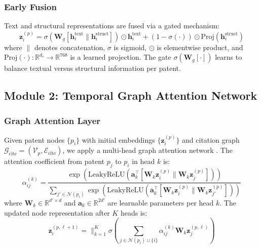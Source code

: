 \documentclass[journal]{IEEEtran}
\begin{document}
\subsubsection{Early Fusion}

Text and structural representations are fused via a gated mechanism:
\begin{equation}
    \mathbf{z}_i^{(p)} = \sigma(\mathbf{W}_g [\mathbf{h}_i^{\text{text}} \| \mathbf{h}_i^{\text{struct}}]) \odot \mathbf{h}_i^{\text{text}} + (1 - \sigma(\cdot)) \odot \text{Proj}(\mathbf{h}_i^{\text{struct}})
    \label{eq:gate}
\end{equation}
where $\|$ denotes concatenation, $\sigma$ is sigmoid, $\odot$ is elementwise product, and $\text{Proj}(\cdot): \mathbb{R}^{d_s} \to \mathbb{R}^{768}$ is a learned projection. The gate $\sigma(\mathbf{W}_g[\cdot])$ learns to balance textual versus structural information per patent.

\subsection{Module 2: Temporal Graph Attention Network}

\subsubsection{Graph Attention Layer}

Given patent nodes $\{p_i\}$ with initial embeddings $\{\mathbf{z}_i^{(p)}\}$ and citation graph $\mathcal{G}_{\text{cite}} = (\mathcal{V}_p, \mathcal{E}_{\text{cite}})$, we apply a multi-head graph attention network \cite{velickovic2018graph}. The attention coefficient from patent $p_j$ to $p_i$ in head $k$ is:
\begin{equation}
    \alpha_{ij}^{(k)} = \frac{\exp\!\left(\text{LeakyReLU}\!\left(\mathbf{a}_k^\top [\mathbf{W}_k \mathbf{z}_i^{(p)} \| \mathbf{W}_k \mathbf{z}_j^{(p)}]\right)\right)}{\sum_{j' \in \mathcal{N}(p_i)} \exp\!\left(\text{LeakyReLU}\!\left(\mathbf{a}_k^\top [\mathbf{W}_k \mathbf{z}_i^{(p)} \| \mathbf{W}_k \mathbf{z}_{j'}^{(p)}]\right)\right)}
    \label{eq:gat_attn}
\end{equation}
where $\mathbf{W}_k \in \mathbb{R}^{d' \times d}$ and $\mathbf{a}_k \in \mathbb{R}^{2d'}$ are learnable parameters per head $k$. The updated node representation after $K$ heads is:
\begin{equation}
    \mathbf{z}_i^{(p,\ell+1)} = \Big\|_{k=1}^{K} \sigma\!\left(\sum_{j \in \mathcal{N}(p_i) \cup \{i\}} \alpha_{ij}^{(k)} \mathbf{W}_k \mathbf{z}_j^{(p,\ell)}\right)
    \label{eq:gat_update}
\end{equation}
\end{document}
